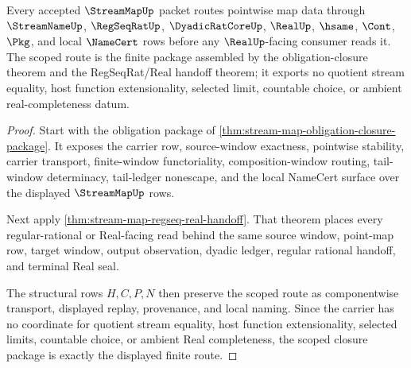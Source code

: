 \begin{theorem}\label{thm:stream-map-scoped-closure-package}
Every accepted $\StreamMapUp$ packet routes pointwise map data through $\StreamNameUp$, $\RegSeqRatUp$, $\DyadicRatCoreUp$, $\RealUp$, $\hsame$, $\Cont$, $\Pkg$, and local $\NameCert$ rows before any $\RealUp$-facing consumer reads it. The scoped route is the finite package assembled by the obligation-closure theorem and the RegSeqRat/Real handoff theorem; it exports no quotient stream equality, host function extensionality, selected limit, countable choice, or ambient real-completeness datum.
\end{theorem}
\begin{proof}
Start with the obligation package of \autoref{thm:stream-map-obligation-closure-package}. It exposes the carrier row, source-window exactness, pointwise stability, carrier transport, finite-window functoriality, composition-window routing, tail-window determinacy, tail-ledger nonescape, and the local NameCert surface over the displayed $\StreamMapUp$ rows.

Next apply \autoref{thm:stream-map-regseq-real-handoff}. That theorem places every regular-rational or Real-facing read behind the same source window, point-map row, target window, output observation, dyadic ledger, regular rational handoff, and terminal Real seal.

The structural rows $H,C,P,N$ then preserve the scoped route as componentwise transport, displayed replay, provenance, and local naming. Since the carrier has no coordinate for quotient stream equality, host function extensionality, selected limits, countable choice, or ambient Real completeness, the scoped closure package is exactly the displayed finite route.
\end{proof}

